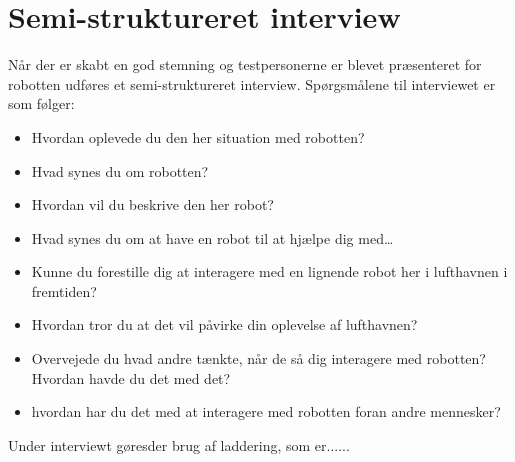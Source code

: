 \section{Semi-struktureret interview}
\label{ParametreInterview}
%
Når der er skabt en god stemning og testpersonerne er blevet præsenteret for robotten udføres et semi-struktureret interview. Spørgsmålene til interviewet er som følger:\blankline
%
\begin{itemize}
	\item Hvordan oplevede du den her situation med robotten?
	\item Hvad synes du om robotten?
	\item Hvordan vil du beskrive den her robot?
	\item Hvad synes du om at have en robot til at hjælpe dig med…
	\item Kunne du forestille dig at interagere med en lignende robot her i lufthavnen i fremtiden?
	\item Hvordan tror du at det vil påvirke din oplevelse af lufthavnen?
	\item Overvejede du hvad andre tænkte, når de så dig interagere med robotten? Hvordan havde du det med det?
	\item hvordan har du det med at interagere med robotten foran andre mennesker?\blankline
\end{itemize}
%
Under interviewt gøresder brug af laddering, som er......


